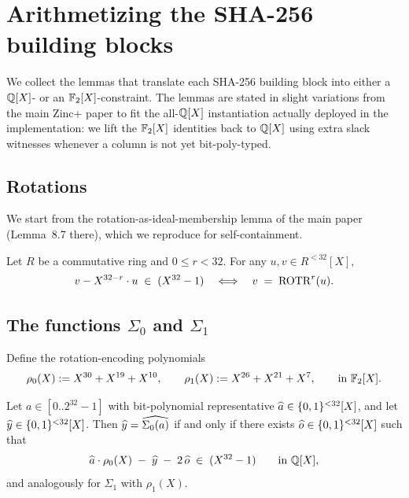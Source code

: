 \section{Arithmetizing the SHA-256 building blocks}\label{sec:arith}

We collect the lemmas that translate each SHA-256 building block into
either a $\mathbb{Q}[X]$- or an $\mathbb{F}_2[X]$-constraint. The lemmas are stated in
slight variations from the main Zinc+ paper to fit the all-$\mathbb{Q}[X]$
instantiation actually deployed in the implementation: we lift the
$\mathbb{F}_2[X]$ identities back to $\mathbb{Q}[X]$ using extra slack witnesses
whenever a column is not yet bit-poly-typed.

\subsection{Rotations}

We start from the rotation-as-ideal-membership lemma of the main paper
(Lemma~8.7 there), which we reproduce for self-containment.

\begin{lemma}\label{lem:rot}
Let $R$ be a commutative ring and $0 \le r < 32$. For any
$u,v \in R^{<32}[X]$,
$$
v - X^{32-r} \cdot u \;\in\; (X^{32}-1)
\quad \Longleftrightarrow \quad
v \;=\; \operatorname{ROTR}^{r}(u).
$$
\end{lemma}

\subsection{The functions $\Sigma_0$ and $\Sigma_1$}\label{sec:big-sigma}

Define the rotation-encoding polynomials
\begin{equation}\label{eq:rho}
\rho_{0}(X) := X^{30} + X^{19} + X^{10}, \qquad
\rho_{1}(X) := X^{26} + X^{21} + X^{7}, \qquad \text{in } \mathbb{F}_2[X].
\end{equation}

\begin{lemma}\label{lem:big-sigma}
Let $a \in [0\mathbin{..}2^{32}-1]$ with bit-polynomial representative
$\widehat{a} \in \{0,1\}^{<32}[X]$, and let $\widehat{y} \in \{0,1\}^{<32}[X]$. Then
$\widehat{y} = \widehat{\Sigma_0(a)}$ if and only if there exists
$\widehat{o} \in \{0,1\}^{<32}[X]$ such that
\begin{equation}\label{eq:sig0-Q}
\widehat{a} \cdot \rho_0(X) \;-\; \widehat{y} \;-\; 2\,\widehat{o} \;\in\; (X^{32}-1)
\qquad \text{in } \mathbb{Q}[X],
\end{equation}
and analogously for $\Sigma_1$ with $\rho_1(X)$.
\end{lemma}

